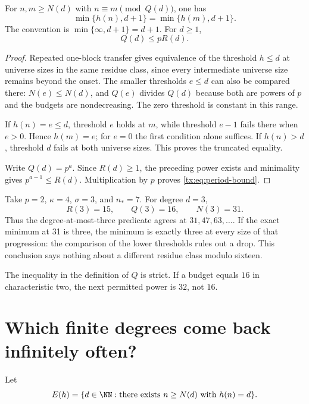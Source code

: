 \begin{proposition}\label{tx:thm:periodicity}
For $n,m\ge N(d)$ with $n\equiv m\pmod{Q(d)}$, one has
\begin{equation}\label{tx:eq:truncated-periodicity}
                     \min\{h(n),d+1\}=\min\{h(m),d+1\}.
\end{equation}
The convention is $\min\{\infty,d+1\}=d+1$. For $d\ge1$,
\begin{equation}\label{tx:eq:period-bound}
                              Q(d)\le pR(d).
\end{equation}
\end{proposition}
\begin{proof}
Repeated one-block transfer gives equivalence of the threshold
$h\le d$ at universe sizes in the same residue class, since every intermediate
universe size remains beyond the onset. The smaller thresholds $e\le d$
can also be compared there: $N(e)\le N(d)$, and $Q(e)$ divides $Q(d)$
because both are powers of $p$ and the budgets are nondecreasing.
The zero threshold is constant in this range.

If $h(n)=e\le d$, threshold $e$ holds at $m$, while threshold $e-1$
fails there when $e>0$. Hence $h(m)=e$; for $e=0$ the first condition
alone suffices. If $h(n)>d$, threshold $d$ fails at both universe sizes. This
proves the truncated equality.

Write $Q(d)=p^a$. Since $R(d)\ge1$, the preceding power exists and
minimality gives $p^{a-1}\le R(d)$. Multiplication by $p$ proves
\eqref{tx:eq:period-bound}.
\end{proof}

\begin{example}\label{tx:eg:numerical-period}
Take $p=2$, $\kappa=4$, $\sigma=3$, and $n_*=7$. For degree $d=3$,
\[
                       R(3)=15,\qquad Q(3)=16,\qquad N(3)=31.
\]
Thus the degree-at-most-three predicate agrees at $31,47,63,\ldots$.
If the exact minimum at 31 is three, the minimum is exactly three at
every size of that progression: the comparison of the lower thresholds
rules out a drop. This conclusion says nothing about a different
residue class modulo sixteen.

The inequality in the definition of $Q$ is strict. If a budget equals
$16$ in characteristic two, the next permitted power is $32$, not $16$.
\end{example}

\section{Which finite degrees come back infinitely often?}
\begin{definition}\label{tx:def:recurring}
Let
\[
 E(h)=\{d\in\NN:\text{there exists }n\ge N(d)\text{ with }h(n)=d\}.
\]
\end{definition}

